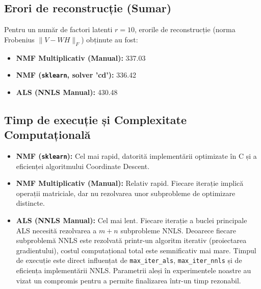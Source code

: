 \documentclass[12pt,a4paper]{article}
\begin{document}
\subsection{Erori de reconstrucție (Sumar)} 
Pentru un număr de factori latenti $r=10$, erorile de reconstrucție (norma Frobenius $\|V - WH\|_F$) obținute au fost:
\begin{itemize}
	\item \textbf{NMF Multiplicativ (Manual):} 337.03
	\item \textbf{NMF (\texttt{sklearn}, solver 'cd'):} 336.42
	\item \textbf{ALS (NNLS Manual):} 430.48
\end{itemize}


\subsection{Timp de execuție și Complexitate Computațională} 
\begin{itemize}
	\item \textbf{NMF (\texttt{sklearn}):} Cel mai rapid, datorită implementării optimizate în C și a eficienței algoritmului Coordinate Descent.
	\item \textbf{NMF Multiplicativ (Manual):} Relativ rapid. Fiecare iterație implică operații matriciale, dar nu rezolvarea unor subprobleme de optimizare distincte.
	\item \textbf{ALS (NNLS Manual):} Cel mai lent. Fiecare iterație a buclei principale ALS necesită rezolvarea a $m+n$ subprobleme NNLS. Deoarece fiecare subproblemă NNLS este rezolvată printr-un algoritm iterativ (proiectarea gradientului), costul computațional total este semnificativ mai mare. Timpul de execuție este direct influențat de \texttt{max\_iter\_als}, \texttt{max\_iter\_nnls} și de eficiența implementării NNLS. Parametrii aleși în experimentele noastre au vizat un compromis pentru a permite finalizarea într-un timp rezonabil.
\end{itemize}
\end{document}
